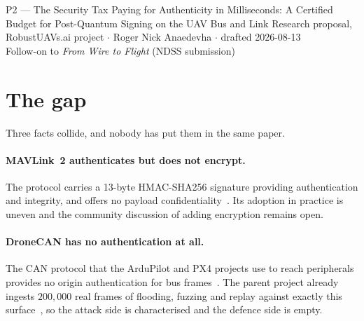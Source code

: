 \documentclass[11pt,a4paper]{article}
\begin{document}
\proposalheader
  {P2 --- The Security Tax}
  {Paying for Authenticity in Milliseconds: A Certified Budget for
   Post-Quantum Signing on the UAV Bus and Link}
  {Research proposal, RobustUAVs.ai project $\cdot$ Roger Nick Anaedevha $\cdot$
   drafted 2026-08-13\\
   Follow-on to \emph{From Wire to Flight} (NDSS submission)}

\begin{abstract}
\noindent
The composition theorem of the parent manuscript bounds the mission-completion
floor achievable when a residual budget $\Delta$ of undetected staleness reaches
the navigation input. The theorem never asks \emph{why} the input is stale. This
proposal takes that indifference seriously: post-quantum authentication on a
constrained UAV bus or command link imposes a latency that is, formally, the
same quantity an adversary spends. Security hardening and the attacker therefore
draw on one budget, and the certificate is what arbitrates between them. We
propose to measure the latency of classical and post-quantum schemes on
flight-controller-class hardware, model the fragmentation cost on DroneCAN and
MAVLink~2, and push the result through the existing chain to obtain a
\emph{certified authentication budget}: the maximum per-message signing latency
a platform can afford and remain airworthy.
\end{abstract}

\section{The gap}
Three facts collide, and nobody has put them in the same paper.

\paragraph{MAVLink~2 authenticates but does not encrypt.}
The protocol carries a 13-byte HMAC-SHA256 signature providing authentication
and integrity, and offers no payload confidentiality~\cite{trout_mavlink}. Its
adoption in practice is uneven and the community discussion of adding
encryption remains open.

\paragraph{DroneCAN has no authentication at all.}
The CAN protocol that the ArduPilot and PX4 projects use to reach peripherals
provides no origin authentication for bus
frames~\cite{dronecan_spec}. The parent project already ingests
$200{,}000$ real frames of flooding, fuzzing and replay against exactly this
surface~\cite{hcrl_uavcan}, so the attack side is characterised and the defence
side is empty.
\end{document}

